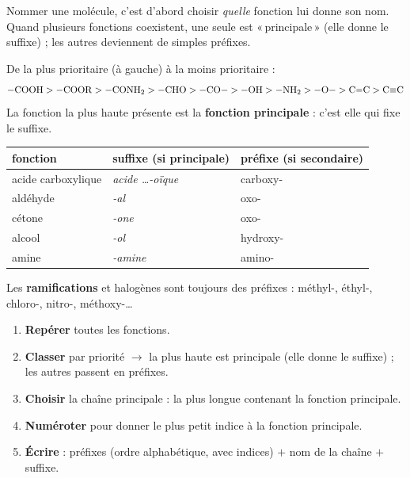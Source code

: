 \documentclass[11pt,a4paper]{article}
\begin{document}

Nommer une molécule, c'est d'abord choisir \emph{quelle} fonction lui donne son nom. Quand plusieurs fonctions coexistent, une seule est «\,principale\,» (elle donne le suffixe) ; les autres deviennent de simples préfixes.

\begin{cle}
De la plus prioritaire (à gauche) à la moins prioritaire :
\[
-\ce{COOH} > -\ce{COOR} > -\ce{CONH2} > -\ce{CHO} > -\ce{CO}- > -\ce{OH} > -\ce{NH2} > -\ce{O}- > \ce{C=C} > \ce{C#C}
\]
La fonction la plus haute présente est la \textbf{fonction principale} : c'est elle qui fixe le suffixe.
\end{cle}

\begin{cle}
\begin{center}\small
\renewcommand{\arraystretch}{1.2}
\begin{tabular}{lll}
\toprule
fonction & suffixe (si principale) & préfixe (si secondaire) \\
\midrule
acide carboxylique & \textit{acide \dots-oïque} & carboxy- \\
aldéhyde & \textit{-al} & oxo- \\
cétone & \textit{-one} & oxo- \\
alcool & \textit{-ol} & hydroxy- \\
amine & \textit{-amine} & amino- \\
\bottomrule
\end{tabular}
\end{center}
Les \textbf{ramifications} et halogènes sont toujours des préfixes : méthyl-, éthyl-, chloro-, nitro-, méthoxy-\dots
\end{cle}

\begin{methode}
\begin{enumerate}[leftmargin=1.6em,itemsep=0.5pt]
  \item \textbf{Repérer} toutes les fonctions.
  \item \textbf{Classer} par priorité $\rightarrow$ la plus haute est principale (elle donne le suffixe) ; les autres passent en préfixes.
  \item \textbf{Choisir} la chaîne principale : la plus longue contenant la fonction principale.
  \item \textbf{Numéroter} pour donner le plus petit indice à la fonction principale.
  \item \textbf{Écrire} : préfixes (ordre alphabétique, avec indices) $+$ nom de la chaîne $+$ suffixe.
\end{enumerate}
\end{methode}
\end{document}
